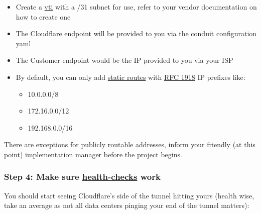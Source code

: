 \documentclass[
]{article}
\providecommand{\tightlist}{%
  \setlength{\itemsep}{0pt}\setlength{\parskip}{0pt}}\usepackage{longtable,booktabs,array}
\begin{document}
\begin{itemize}
\tightlist
\item
  Create a
  \href{https://docs.strongswan.org/docs/5.9/features/routeBasedVpn.html\#XFRM-Interfaces-on-Linux}{vti}
  with a /31 subnet for use, refer to your vendor documentation on how
  to create one
\item
  The Cloudflare endpoint will be provided to you via the conduit
  configuration yaml
\item
  The Customer endpoint would be the IP provided to you via your ISP
\item
  By default, you can only add
  \href{https://developers.cloudflare.com/magic-wan/configuration/manually/how-to/configure-static-routes/}{static
  routes} with \href{https://datatracker.ietf.org/doc/html/rfc1918}{RFC
  1918} IP prefixes like:

  \begin{itemize}
  \tightlist
  \item
    10.0.0.0/8
  \item
    172.16.0.0/12
  \item
    192.168.0.0/16
  \end{itemize}
\end{itemize}

There are exceptions for publicly routable addresses, inform your
friendly (at this point) implementation manager before the project
begins.

\subsubsection{\texorpdfstring{Step 4: Make sure
\href{https://developers.cloudflare.com/magic-wan/configuration/manually/how-to/tunnel-health-checks/}{health-checks}
work}{Step 4: Make sure health-checks work}}\label{step-4-make-sure-health-checks-work}

You should start seeing Cloudflare's side of the tunnel hitting yours
(health wise, take an average as not all data centers pinging your end
of the tunnel matters):
\end{document}
